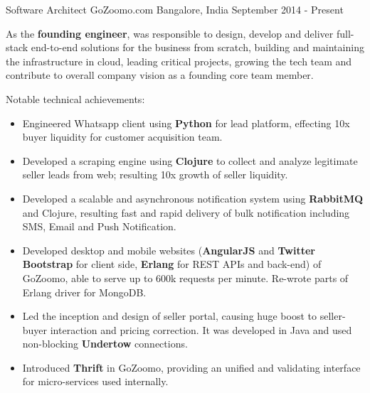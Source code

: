 

\begin{cventries}

  \cventry
    {Software Architect} %
    {GoZoomo.com} %
    {Bangalore, India} %
    {September 2014 - Present} %
    {
      \begin{cvitems} %
        \item {As the \textbf{founding engineer}, was responsible to design, develop and deliver full-stack end-to-end solutions for the business from scratch, building and maintaining the infrastructure in cloud, leading critical projects, growing the tech team and contribute to overall company vision as a founding core team member.}
        \item {Notable technical achievements:}
        \begin{itemize}
         \item {Engineered Whatsapp client using \textbf{Python} for lead platform, effecting 10x buyer liquidity for customer acquisition team.}
         \item {Developed a scraping engine using \textbf{Clojure} to collect and analyze legitimate seller leads from web; resulting 10x growth of seller liquidity.}
         \item {Developed a scalable and asynchronous notification system using \textbf{RabbitMQ} and Clojure, resulting fast and rapid delivery of bulk notification including SMS, Email and Push Notification.}
         \item {Developed desktop and mobile websites (\textbf{AngularJS} and \textbf{Twitter Bootstrap} for client side, \textbf{Erlang} for REST APIs and back-end) of GoZoomo, able to serve up to 600k requests per minute. Re-wrote parts of Erlang driver for MongoDB.}
         \item {Led the inception and design of seller portal, causing huge boost to seller-buyer interaction and pricing correction. It was developed in Java and used non-blocking \textbf{Undertow} connections.}
         \item {Introduced \textbf{Thrift} in GoZoomo, providing an unified and validating interface for micro-services used internally.}

\end{itemize}
\end{cvitems}}
\end{cventries}
